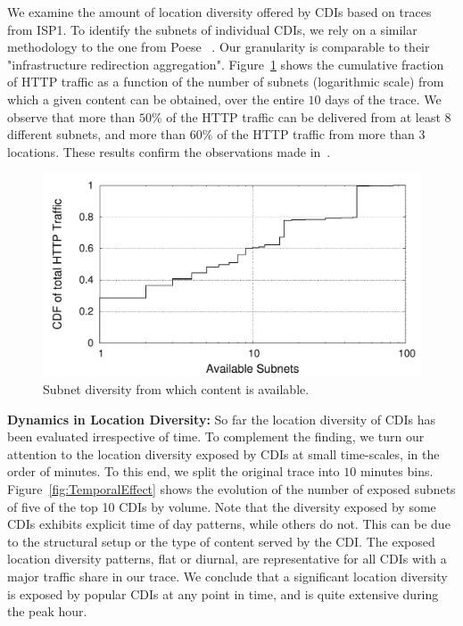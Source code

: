 We examine the amount of location diversity offered by CDIs based on traces from
ISP1.  To identify the subnets of individual CDIs, we rely on a similar
methodology to the one from Poese \etal~\cite{PADIS2010}. Our granularity is
comparable to their "infrastructure redirection
aggregation". Figure~\ref{fig:VolumeChoices} shows the cumulative fraction of
HTTP traffic as a function of the number of subnets (logarithmic scale) from
which a given content can be obtained, over the entire $10$ days of the
trace. We observe that more than $50\%$ of the HTTP traffic can be delivered
from at least $8$ different subnets, and more than $60\%$ of the HTTP traffic
from more than $3$ locations. These results confirm the observations made
in~\cite{PADIS2010}.


\begin{figure}[tbp]
\center\includegraphics[width=1\linewidth]{figures-pdf/subnetVsVolumeBucket}
\caption{Subnet diversity from which content is available.}
\label{fig:VolumeChoices}
\vspace{-1.5em}
\end{figure}



\noindent\textbf{Dynamics in Location Diversity:}\label{sec:Server-Dynamics}
So far the location diversity of CDIs has been evaluated irrespective of time.
To complement the finding, we turn our attention to the location diversity
exposed by CDIs at small time-scales, \ie in the order of minutes.  To this
end, we split the original trace into $10$ minutes bins.
Figure~\ref{fig:TemporalEffect} shows the evolution of the number of exposed
subnets of five of the top 10 CDIs by volume.  Note that the diversity exposed
by some CDIs exhibits explicit time of day patterns, while others do not. This
can be due to the structural setup or the type of content served by the CDI.
The exposed location diversity patterns, \ie flat or diurnal, are
representative for all CDIs with a major traffic share in our trace. We
conclude that a significant location diversity is exposed by popular CDIs at
any point in time, and is quite extensive during the peak hour.

